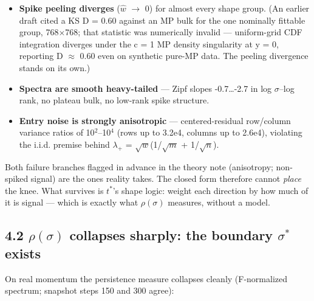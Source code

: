 \documentclass[
]{article}
\providecommand{\tightlist}{%
  \setlength{\itemsep}{0pt}\setlength{\parskip}{0pt}}
\begin{document}
\begin{itemize}
\tightlist
\item
  \textbf{Spike peeling diverges} (\(\hat{w}\) \(\to\) 0) for almost
  every shape group. (An earlier draft cited a KS D = 0.60 against an MP
  bulk for the one nominally fittable group, 768\(\times\){}768; that
  statistic was numerically invalid --- uniform-grid CDF integration
  diverges under the c = 1 MP density singularity at y = 0, reporting D
  \(\approx\) 0.60 even on synthetic pure-MP data. The peeling
  divergence stands on its own.)
\item
  \textbf{Spectra are smooth heavy-tailed} --- Zipf slopes
  -0.7\ldots-2.7 in log \(\sigma\)--log rank, no plateau bulk, no
  low-rank spike structure.
\item
  \textbf{Entry noise is strongly anisotropic} --- centered-residual
  row/column variance ratios of 10\(^2\)--10\(^4\) (rows up to 3.2e4,
  columns up to 2.6e4), violating the i.i.d. premise behind
  \(\lambda_+\) = \(\sqrt{w}\)(1/\(\sqrt{m}\) + 1/\(\sqrt{n}\)).
\end{itemize}

Both failure branches flagged in advance in the theory note (anisotropy;
non-spiked signal) are the ones reality takes. The closed form therefore
cannot \emph{place} the knee. What survives is \(t^*\)'s shape logic:
weight each direction by how much of it is signal --- which is exactly
what \(\rho(\sigma)\) measures, without a model.

\subsection{\texorpdfstring{4.2 \(\rho(\sigma)\) collapses sharply: the
boundary \(\sigma^*\)
exists}{4.2 \textbackslash rho(\textbackslash sigma) collapses sharply: the boundary \textbackslash sigma\^{}* exists}}\label{rhosigma-collapses-sharply-the-boundary-sigma-exists}

On real momentum the persistence measure collapses cleanly (F-normalized
spectrum; snapshot steps 150 and 300 agree):
\end{document}
